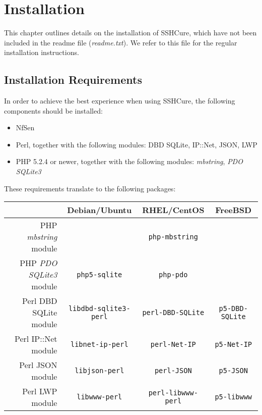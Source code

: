 \section{Installation} \label{sec:installation}

This chapter outlines details on the installation of SSHCure, which have not been included in the readme file (\emph{readme.txt}). We refer to this file for the regular installation instructions.

\subsection{Installation Requirements} \label{subsec:installation_requirements}

In order to achieve the best experience when using SSHCure, the following components should be installed:

\begin{itemize}
	\item NfSen
	\item Perl, together with the following modules: DBD SQLite, IP::Net, JSON, LWP
	\item PHP 5.2.4 or newer, together with the following modules: \textit{mbstring}, \textit{PDO SQLite3}
\end{itemize}

These requirements translate to the following packages:

\begin{table}[!h]
	\renewcommand{\arraystretch}{1.3}
	\centering
	\begin{tabular}{r || c | c | c}
									&	\textbf{Debian/Ubuntu}		&	\textbf{RHEL/CentOS} 	&	\textbf{FreeBSD} \\ \hline \hline
		PHP \textit{mbstring} module		&							&	\texttt{php-mbstring} 		&	\texttt{} \\ \hline
		PHP \textit{PDO SQLite3} module	&	\texttt{php5-sqlite}			&	\texttt{php-pdo} 		&	\texttt{} \\ \hline
		Perl DBD SQLite module			&	\texttt{libdbd-sqlite3-perl}		&	\texttt{perl-DBD-SQLite}	&	\texttt{p5-DBD-SQLite} \\ \hline
		Perl IP::Net module				& 	\texttt{libnet-ip-perl}			&	\texttt{perl-Net-IP} 		&	\texttt{p5-Net-IP} \\ \hline
		Perl JSON module				& 	\texttt{libjson-perl}			&	\texttt{perl-JSON} 		&	\texttt{p5-JSON} \\ \hline
		Perl LWP module				&	\texttt{libwww-perl}			&	\texttt{perl-libwww-perl} 	&	\texttt{p5-libwww} \\ \hline
	\end{tabular}
\end{table}
